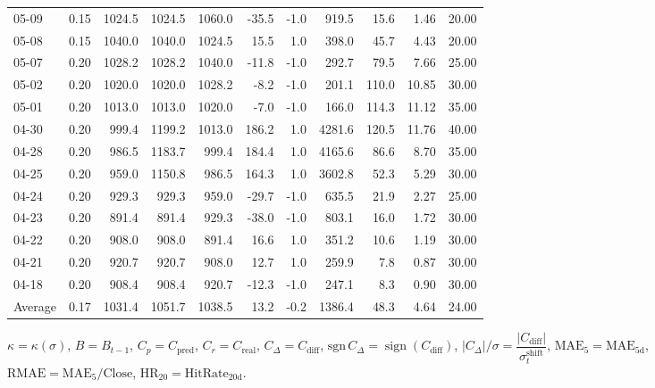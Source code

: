 \begin{threeparttable}
{\begin{tabular}{lrrrrrrrrrr}
05-09 & 0.15 & 1024.5 & 1024.5 & 1060.0 & -35.5 & -1.0 & 919.5 & 15.6 & 1.46 & 20.00 \\
05-08 & 0.15 & 1040.0 & 1040.0 & 1024.5 & 15.5 & 1.0 & 398.0 & 45.7 & 4.43 & 20.00 \\
05-07 & 0.20 & 1028.2 & 1028.2 & 1040.0 & -11.8 & -1.0 & 292.7 & 79.5 & 7.66 & 25.00 \\
05-02 & 0.20 & 1020.0 & 1020.0 & 1028.2 & -8.2 & -1.0 & 201.1 & 110.0 & 10.85 & 30.00 \\
05-01 & 0.20 & 1013.0 & 1013.0 & 1020.0 & -7.0 & -1.0 & 166.0 & 114.3 & 11.12 & 35.00 \\
04-30 & 0.20 & 999.4 & 1199.2 & 1013.0 & 186.2 & 1.0 & 4281.6 & 120.5 & 11.76 & 40.00 \\
04-28 & 0.20 & 986.5 & 1183.7 & 999.4 & 184.4 & 1.0 & 4165.6 & 86.6 & 8.70 & 35.00 \\
04-25 & 0.20 & 959.0 & 1150.8 & 986.5 & 164.3 & 1.0 & 3602.8 & 52.3 & 5.29 & 30.00 \\
04-24 & 0.20 & 929.3 & 929.3 & 959.0 & -29.7 & -1.0 & 635.5 & 21.9 & 2.27 & 25.00 \\
04-23 & 0.20 & 891.4 & 891.4 & 929.3 & -38.0 & -1.0 & 803.1 & 16.0 & 1.72 & 30.00 \\
04-22 & 0.20 & 908.0 & 908.0 & 891.4 & 16.6 & 1.0 & 351.2 & 10.6 & 1.19 & 30.00 \\
04-21 & 0.20 & 920.7 & 920.7 & 908.0 & 12.7 & 1.0 & 259.9 & 7.8 & 0.87 & 30.00 \\
04-18 & 0.20 & 908.4 & 908.4 & 920.7 & -12.3 & -1.0 & 247.1 & 8.3 & 0.90 & 30.00 \\
Average & 0.17 & 1031.4 & 1051.7 & 1038.5 & 13.2 & -0.2 & 1386.4 & 48.3 & 4.64 & 24.00 \\
\bottomrule
\end{tabular}
}%
\begin{tablenotes}\footnotesize
\item $\kappa=\kappa(\sigma)$, $B=B_{t-1}$, $C_p=C_{\text{pred}}$, $C_r=C_{\text{real}}$, $C_\Delta=C_{\text{diff}}$, $\mathrm{sgn}\,C_\Delta=\operatorname{sign}(C_{\text{diff}})$, $|C_\Delta|/\sigma=\dfrac{|C_{\text{diff}}|}{\sigma_t^{\text{shift}}}$, $\mathrm{MAE}_5=\mathrm{MAE}_{5\text{d}}$, $\mathrm{RMAE}= \mathrm{MAE}_5 / \text{Close}$, $\mathrm{HR}_{20}=\mathrm{HitRate}_{20\text{d}}$.
\end{tablenotes}
\end{threeparttable}
\endgroup